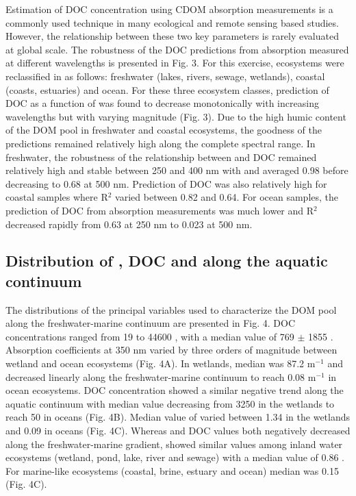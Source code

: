 Estimation of DOC concentration using CDOM absorption measurements is a commonly used technique in many ecological and remote sensing based studies. However, the relationship between these two key parameters is rarely evaluated at global scale. The robustness of the DOC predictions from absorption measured at different wavelengths is presented in Fig. 3. For this exercise, ecosystems were reclassified in as follows: freshwater (lakes, rivers, sewage, wetlands), coastal (coasts, estuaries) and ocean. For these three ecosystem classes, prediction of DOC as a function of \acdom{\lambda} was found to decrease monotonically with increasing wavelengths but with varying magnitude (Fig. 3). Due to the high humic content of the DOM pool in freshwater and coastal ecosystems, the goodness of the predictions remained relatively high along the complete spectral range. In freshwater, the robustness of the relationship between \acdom{\lambda} and DOC remained relatively high and stable between 250 and 400 nm with and averaged 0.98 before decreasing to 0.68 at 500 nm. Prediction of DOC was also relatively high for coastal samples where R$^2$ varied between 0.82 and 0.64. For ocean samples, the prediction of DOC from absorption measurements was much lower and R$^2$ decreased rapidly from 0.63 at 250 nm to 0.023 at 500 nm.

\subsection*{Distribution of , DOC and  along the aquatic continuum}

The distributions of the principal variables used to characterize the DOM pool along the freshwater-marine continuum are presented in Fig. 4. DOC concentrations ranged from 19 to 44600 \mmol, with a median value of 769 $\pm$ 1855 \mmol. Absorption coefficients at 350 nm varied by three orders of magnitude between wetland and ocean ecosystems (Fig. 4A). In wetlands, median  was 87.2 m$^{-1}$ and decreased linearly along the freshwater-marine continuum to reach 0.08 m$^{-1}$ in ocean ecosystems. DOC concentration showed a similar negative trend along the aquatic continuum with median value decreasing from 3250 \mmol in the wetlands to reach 50 \mmol in oceans (Fig. 4B). Median value of  varied between 1.34 \suvagram in the wetlands and 0.09 \suvagram in oceans (Fig. 4C). Whereas  and DOC values both negatively decreased along the freshwater-marine gradient,  showed similar values among inland water ecosystems (wetland, pond, lake, river and sewage) with a median value of 0.86 \suvagram. For marine-like ecosystems (coastal, brine, estuary and ocean) median  was 0.15 \suvagram (Fig. 4C).

